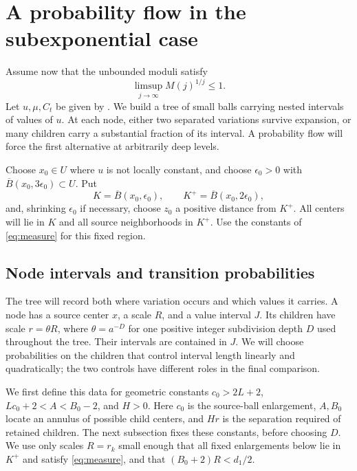 \section{A probability flow in the subexponential case}
\label{sec:flow}

Assume now that the unbounded moduli satisfy
\begin{equation}
 \limsup_{j\to\infty}M(j)^{1/j}\leq1.
 \label{eq:subexponential-growth}
\end{equation}
Let $u,\mu,C_t$ be given by . We build a tree of
small balls carrying nested intervals of values of $u$. At each node,
either two separated variations survive expansion, or many children
carry a substantial fraction of its interval. A probability flow will
force the first alternative at arbitrarily deep levels.

Choose $x_0\in U$ where $u$ is not locally constant, and choose
$\epsilon_0>0$ with $\overline B(x_0,3\epsilon_0)\subset U$. Put
\[
 K=\overline B(x_0,\epsilon_0),\qquad
 K^+=\overline B(x_0,2\epsilon_0),
\]
and, shrinking $\epsilon_0$ if necessary, choose $z_0$ a positive distance
from $K^+$. All centers will lie in $K$ and all source neighborhoods in
$K^+$. Use the constants of \eqref{eq:measure} for this fixed region.

\subsection{Node intervals and transition probabilities}

The tree will record both where variation occurs and which values it
carries. A node has a source center $x$, a scale $R$, and a value interval
$J$. Its children have scale $r=\theta R$, where $\theta=a^{-D}$ for
one positive integer subdivision depth $D$ used throughout the tree. Their intervals
are contained in $J$. We will choose probabilities on the children
that control interval length linearly and quadratically; the two
controls have different roles in the final comparison.

We first define this data for geometric constants $c_0>2L+2$,
$Lc_0+2<A<B_0-2$, and $H>0$. Here $c_0$ is the source-ball enlargement,
$A,B_0$ locate an annulus of possible child centers, and $Hr$ is the
separation required of retained children. The next subsection fixes
these constants, before choosing $D$. We use only scales $R=r_k$
small enough that all fixed enlargements below lie in $K^+$ and
satisfy \eqref{eq:measure}, and that $(B_0+2)R<d_1/2$.

